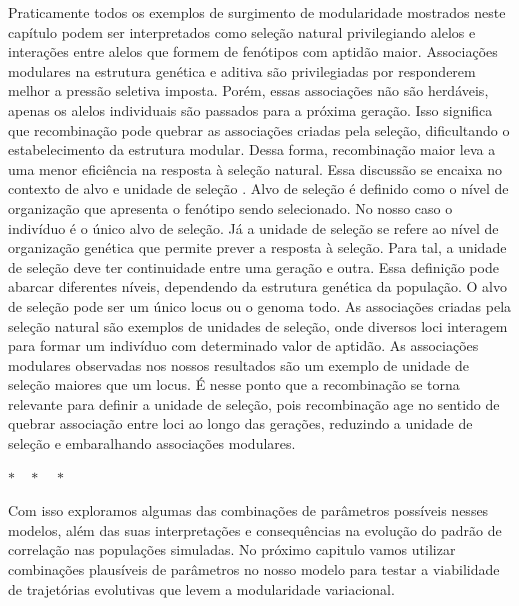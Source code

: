 Praticamente todos os exemplos de surgimento de modularidade mostrados
neste capítulo podem ser interpretados como seleção natural
privilegiando alelos e interações entre alelos que formem
de fenótipos com aptidão maior.
Associações modulares na estrutura genética e aditiva são privilegiadas
por responderem melhor a pressão seletiva imposta.
Porém, essas associações não são herdáveis, apenas os alelos individuais
são passados para a próxima geração.
Isso significa que recombinação pode quebrar as associações criadas pela
seleção, dificultando o estabelecimento da estrutura modular.
Dessa forma, recombinação maior leva a uma menor eficiência na resposta à
seleção natural.
Essa discussão se encaixa no contexto de alvo e unidade de
seleção \citep{Templeton2003}.
Alvo de seleção é definido como o nível de organização que apresenta o
fenótipo sendo selecionado.
No nosso caso o indivíduo é o único alvo de seleção.
Já a unidade de seleção se refere ao nível de organização genética que
permite prever a resposta à seleção.
Para tal, a unidade de seleção deve ter continuidade entre uma geração e
outra.
Essa definição pode abarcar diferentes níveis, dependendo da estrutura
genética da população.
O alvo de seleção pode ser um único locus ou o genoma todo.
As associações criadas pela seleção natural são exemplos de unidades de
seleção, onde diversos loci interagem para formar um indivíduo com
determinado valor de aptidão.
As associações modulares observadas nos nossos resultados são um
exemplo de unidade de seleção maiores que um locus.
É nesse ponto que a recombinação se torna relevante para definir a
unidade de seleção, pois recombinação age no sentido de quebrar
associação entre loci ao longo das gerações, reduzindo a unidade de
seleção e embaralhando associações modulares.

\centerline { $ * \quad * \quad * $ }

Com isso exploramos algumas das combinações de parâmetros possíveis
nesses modelos, além das suas interpretações e consequências na evolução
do padrão de correlação nas populações simuladas.
No próximo capitulo vamos utilizar combinações plausíveis de parâmetros
no nosso modelo para testar a viabilidade de trajetórias evolutivas que
levem a modularidade variacional.


